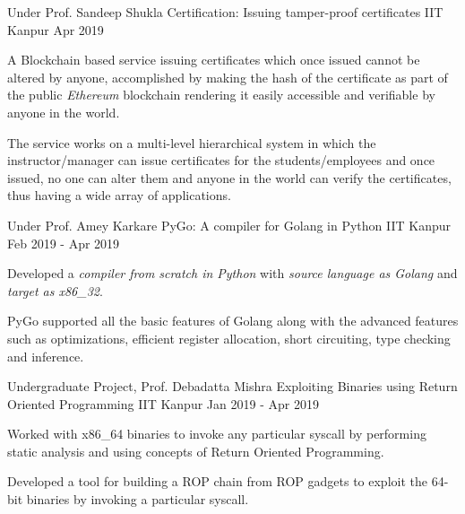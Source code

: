 \begin{cventries}


  \cventry
    {Under Prof. Sandeep Shukla} %
    {Certification: Issuing tamper-proof certificates} %
    {IIT Kanpur} %
    {Apr 2019} %
    {
      \begin{cvitems} %
        \item {A Blockchain based service issuing certificates which once issued cannot be altered by anyone, accomplished by making the hash of the certificate as part of the public \textit{Ethereum} blockchain rendering it easily accessible and verifiable by anyone in the world.}
        \item {The service works on a multi-level hierarchical system in which the instructor/manager can issue certificates for the students/employees and once issued, no one can alter them and anyone in the world can verify the certificates, thus having a wide array of applications.}
      \end{cvitems}
    }



  \cventry
    {Under Prof. Amey Karkare} %
    {PyGo: A compiler for Golang in Python} %
    {IIT Kanpur} %
    {Feb 2019 - Apr 2019} %
    {
      \begin{cvitems} %
      \item {Developed a \textit{compiler from scratch in Python} with \textit{source language as Golang} and \textit{target as x86\_32}.}
      \item {PyGo supported all the basic features of Golang along with the advanced features such as optimizations, efficient register allocation, short circuiting, type checking and inference.}
      \end{cvitems}
    }



  \cventry
    {Undergraduate Project, Prof. Debadatta Mishra} %
    {Exploiting Binaries using Return Oriented Programming} %
    {IIT Kanpur} %
    {Jan 2019 - Apr 2019} %
    {
      \begin{cvitems} %
        \item {Worked with x86\_64 binaries to invoke any particular syscall by performing static analysis and using concepts of Return Oriented Programming.}
        \item {Developed a tool for building a ROP chain from ROP gadgets to exploit the 64-bit binaries by invoking a particular syscall.}
      \end{cvitems}
    }


\end{cventries}
